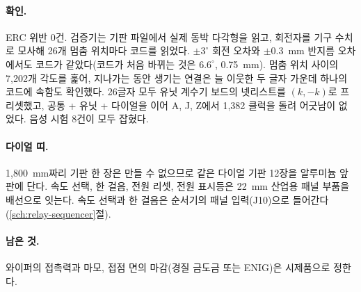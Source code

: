 \paragraph{확인.} ERC 위반 0건. 검증기는 기판 파일에서 실제 동박 다각형을 읽고, 회전자를 기구 수치로 모사해 26개 멈춤
위치마다 코드를 읽었다. $\pm 3^\circ$ 회전 오차와 $\pm 0.3$~mm 반지름 오차에서도 코드가 같았다(코드가 처음 바뀌는 것은
$6.6^\circ$, 0.75~mm). 멈춤 위치 사이의 7,202개 각도를 훑어, 지나가는 동안 생기는 연결은 늘 이웃한 두 글자 가운데 하나의
코드에 속함도 확인했다. 26글자 모두 유닛 계수기 보드의 넷리스트를 $(k, -k)$로 프리셋했고, 공통 + 유닛 + 다이얼을 이어
A, J, Z에서 1,382 클럭을 돌려 어긋남이 없었다. 음성 시험 8건이 모두 잡혔다.

\paragraph{다이얼 띠.} 1,800~mm짜리 기판 한 장은 만들 수 없으므로 같은 다이얼 기판 12장을 알루미늄 앞판에 단다. 속도
선택, 한 걸음, 전원 리셋, 전원 표시등은 22~mm 산업용 패널 부품을 배선으로 잇는다. 속도 선택과 한 걸음은 순서기의 패널 입력(J10)으로
들어간다(\ref{sch:relay-sequencer}절).

\paragraph{남은 것.} 와이퍼의 접촉력과 마모, 접점 면의 마감(경질 금도금 또는 ENIG)은 시제품으로 정한다.

